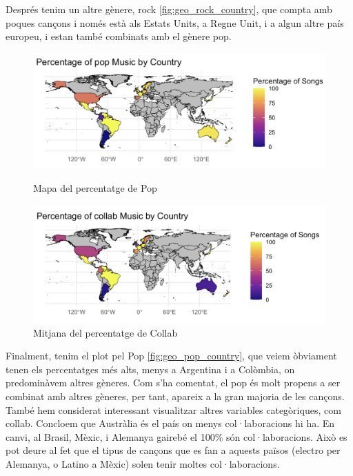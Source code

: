 Després tenim un altre gènere, rock \ref{fig:geo_rock_country}, que compta amb poques cançons i només està als Estats Units, a Regne Unit, i a algun altre país europeu, i estan també combinats amb el gènere pop.

\begin{figure}[H]
\centering
    \begin{minipage}{.5\textwidth}
        \centering
        \includegraphics[width=0.99\linewidth]{Images/7_Geospatial/1_descriptive/percent_genere_per_pais/per_pop.png}
        \caption{Mapa del percentatge de Pop}
        \label{fig:geo_pop_country}
    \end{minipage}%
    \begin{minipage}{.5\textwidth}
        \centering
        \includegraphics[width=0.99\linewidth]{Images/7_Geospatial/1_descriptive/percent_genere_per_pais/per_collab.png}
        \caption{Mitjana del percentatge de Collab}
        \label{fig:geo_collab_country}
    \end{minipage}%
\end{figure}

Finalment, tenim el plot pel Pop \ref{fig:geo_pop_country}, que veiem òbviament tenen els percentatges més alts, menys a Argentina i a Colòmbia, on predominàvem altres gèneres. Com s'ha comentat, el pop és molt propens a ser combinat amb altres gèneres, per tant, apareix a la gran majoria de les cançons. \\

També hem considerat interessant visualitzar altres variables categòriques, com collab. Concloem que Austràlia és el país on menys col·laboracions hi ha. En canvi, al Brasil, Mèxic, i Alemanya gairebé el 100\% són col·laboracions. Això es pot deure al fet que el tipus de cançons que es fan a aquests països (electro per Alemanya, o Latino a Mèxic) solen tenir moltes col·laboracions.


